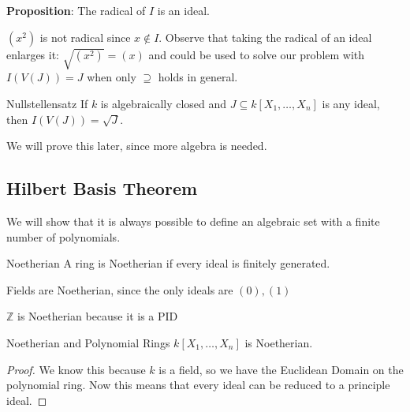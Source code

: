 \documentclass{report}
\begin{document}
\textbf{Proposition}: The radical of $I$ is an ideal.
    \begin{examples}
        \begin{example}
            $(x^{2})$ is not radical since $x \notin I$. Observe that taking the radical of an ideal enlarges it: $\sqrt{(x^{2})} = (x)$ and could be used to solve our problem with $I(V(J)) = J$ when only $\supseteq $ holds in general.
        \end{example}
    \end{examples}

\begin{theorem}{Nullstellensatz}
    If $k$ is algebraically closed and $J \subseteq k[X_{1}, \ldots, X_{n}]$ is any ideal, then $I(V(J)) = \sqrt{J}$.
\end{theorem}
We will prove this later, since more algebra is needed.

\begin{topic}
    \section{Hilbert Basis Theorem}
\end{topic}

We will show that it is always possible to define an algebraic set with a finite number of polynomials.

\begin{definition}{Noetherian}
    A ring is Noetherian if every ideal is finitely generated.
\end{definition}

\begin{examples}
    \begin{example}
        Fields are Noetherian, since the only ideals are $(0), (1)$
    \end{example}

    \begin{example}
        $\mathbb{Z}$ is Noetherian because it is a PID
    \end{example}
\end{examples}

\begin{theorem}{Noetherian and Polynomial Rings}
    $k[X_{1}, \ldots, X_{n}]$ is Noetherian.
\end{theorem}   
    \begin{proof}
        We know this because $k$ is a field, so we have the Euclidean Domain on the polynomial ring. Now this means that every ideal can be reduced to a principle ideal.
    \end{proof}
\end{document}
